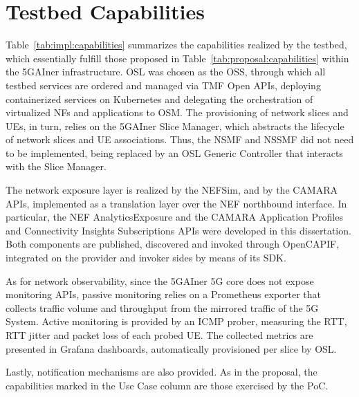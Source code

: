 \section{Testbed Capabilities}
\label{chap:impl:capabilities}

Table~\ref{tab:impl:capabilities} summarizes the capabilities realized by the testbed, which essentially fulfill those proposed in Table~\ref{tab:proposal:capabilities} within the 5GAIner infrastructure. \acs{OSL} was chosen as the \acs{OSS}, through which all testbed services are ordered and managed via \acs{TMF} Open \acsp{API}, deploying containerized services on Kubernetes and delegating the orchestration of virtualized \acsp{NF} and applications to \acs{OSM}. The provisioning of network slices and \acsp{UE}, in turn, relies on the 5GAIner Slice Manager, which abstracts the lifecycle of network slices and \acs{UE} associations. Thus, the \acs{NSMF} and \acs{NSSMF} did not need to be implemented, being replaced by an \acs{OSL} Generic Controller that interacts with the Slice Manager.

The network exposure layer is realized by the \acs{NEF}Sim, and by the CAMARA \acsp{API}, implemented as a translation layer over the \acs{NEF} northbound interface. In particular, the \acs{NEF} AnalyticsExposure and the CAMARA Application Profiles and Connectivity Insights Subscriptions \acsp{API} were developed in this dissertation. Both components are published, discovered and invoked through Open\acs{CAPIF}, integrated on the provider and invoker sides by means of its \acs{SDK}.

As for network observability, since the 5GAIner \acs{5G} core does not expose monitoring \acsp{API}, passive monitoring relies on a Prometheus exporter that collects traffic volume and throughput from the mirrored traffic of the \acs{5G} System. Active monitoring is provided by an \acs{ICMP} prober, measuring the \acs{RTT}, \acs{RTT} jitter and packet loss of each probed \acs{UE}. The collected metrics are presented in Grafana dashboards, automatically provisioned per slice by \acs{OSL}.

Lastly, notification mechanisms are also provided. As in the proposal, the capabilities marked in the Use Case column are those exercised by the \acs{PoC}.

